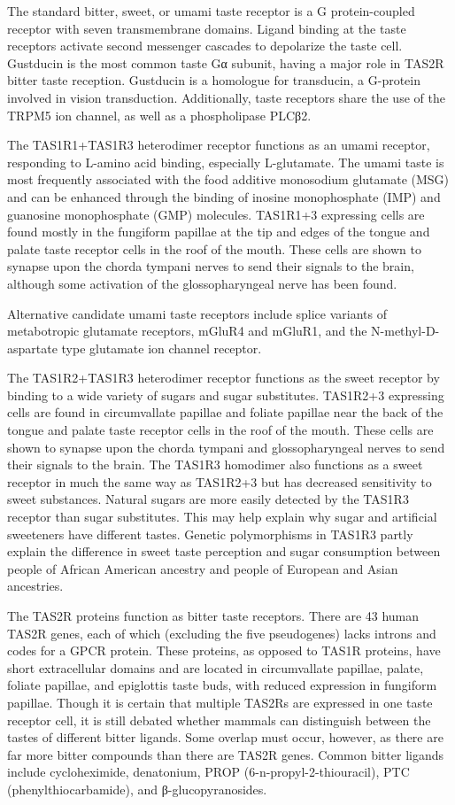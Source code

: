 The standard bitter, sweet, or umami taste receptor is a G protein-coupled receptor with seven transmembrane domains. Ligand binding at the taste receptors activate second messenger cascades to depolarize the taste cell. Gustducin is the most common taste Gα subunit, having a major role in TAS2R bitter taste reception. Gustducin is a homologue for transducin, a G-protein involved in vision transduction. Additionally, taste receptors share the use of the TRPM5 ion channel, as well as a phospholipase PLCβ2.

The TAS1R1+TAS1R3 heterodimer receptor functions as an umami receptor, responding to L-amino acid binding, especially L-glutamate. The umami taste is most frequently associated with the food additive monosodium glutamate (MSG) and can be enhanced through the binding of inosine monophosphate (IMP) and guanosine monophosphate (GMP) molecules. TAS1R1+3 expressing cells are found mostly in the fungiform papillae at the tip and edges of the tongue and palate taste receptor cells in the roof of the mouth. These cells are shown to synapse upon the chorda tympani nerves to send their signals to the brain, although some activation of the glossopharyngeal nerve has been found.

Alternative candidate umami taste receptors include splice variants of metabotropic glutamate receptors, mGluR4 and mGluR1, and the N-methyl-D-aspartate type glutamate ion channel receptor.

The TAS1R2+TAS1R3 heterodimer receptor functions as the sweet receptor by binding to a wide variety of sugars and sugar substitutes. TAS1R2+3 expressing cells are found in circumvallate papillae and foliate papillae near the back of the tongue and palate taste receptor cells in the roof of the mouth. These cells are shown to synapse upon the chorda tympani and glossopharyngeal nerves to send their signals to the brain. The TAS1R3 homodimer also functions as a sweet receptor in much the same way as TAS1R2+3 but has decreased sensitivity to sweet substances. Natural sugars are more easily detected by the TAS1R3 receptor than sugar substitutes. This may help explain why sugar and artificial sweeteners have different tastes. Genetic polymorphisms in TAS1R3 partly explain the difference in sweet taste perception and sugar consumption between people of African American ancestry and people of European and Asian ancestries.

The TAS2R proteins function as bitter taste receptors. There are 43 human TAS2R genes, each of which (excluding the five pseudogenes) lacks introns and codes for a GPCR protein. These proteins, as opposed to TAS1R proteins, have short extracellular domains and are located in circumvallate papillae, palate, foliate papillae, and epiglottis taste buds, with reduced expression in fungiform papillae. Though it is certain that multiple TAS2Rs are expressed in one taste receptor cell, it is still debated whether mammals can distinguish between the tastes of different bitter ligands. Some overlap must occur, however, as there are far more bitter compounds than there are TAS2R genes. Common bitter ligands include cycloheximide, denatonium, PROP (6-n-propyl-2-thiouracil), PTC (phenylthiocarbamide), and β-glucopyranosides.

